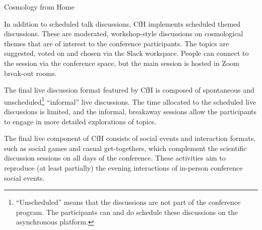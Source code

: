 \documentclass[../SustainableHEP.tex]{subfiles}
\begin{document}
\begin{casestudy}{Cosmology from Home}



In addition to scheduled talk discussions, CfH implements scheduled themed discussions. These are moderated, workshop-style discussions on cosmological themes that are of interest to the conference participants. The topics are suggested, voted on and chosen via the Slack workspace. People can connect to the session via the conference space, but the main session is hosted in Zoom break-out rooms.

The final live discussion format featured by CfH is composed of spontaneous and unscheduled\footnote{“Unscheduled” means that the discussions are not part of the conference program. The participants can and do schedule these discussions on the asynchronous platform.} “informal” live discussions. The time allocated to the scheduled live discussions is limited, and the informal, breakaway sessions allow the participants to engage in more detailed explorations of topics.

The final live component of CfH consists of social events and interaction formats, such as social games and casual get-togethers, which complement the scientific discussion sessions on all days of the conference.
These activities aim to reproduce (at least partially) the evening interactions of in-person conference social events.


\end{casestudy}
\end{document}
